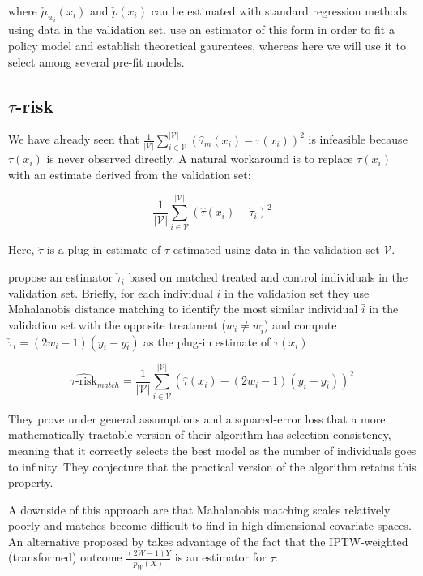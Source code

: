 where $\check\mu_{w_i}(x_i)$ and $\check p(x_i)$ can be estimated with standard regression methods using data in the validation set. \citet{Athey:wj} use an estimator of this form in order to fit a policy model and establish theoretical gaurentees, whereas here we will use it to select among several pre-fit models.

\subsection{$\tau$-risk}

We have already seen that $\frac{1}{|\mathcal{V}|}\sum_{i \in \mathcal{V}}^{|\mathcal{V}|}  (\hat \tau_m (x_i)- \tau(x_i))^2$ is infeasible because $\tau(x_i)$ is never observed directly. A natural workaround is to replace $\tau(x_i)$ with an estimate derived from the validation set:

\[
\frac{1}{|\mathcal{V}|}\sum_{i \in \mathcal{V}}^{|\mathcal{V}|}  (\hat \tau (x_i) -  \check \tau_i)^2
\]

Here, $\check \tau$ is a plug-in estimate of $\tau$ estimated using data in the validation set $\mathcal{V}$. 

\citet{Rolling:2013kz} propose an estimator $\check \tau_i$ based on matched treated and control individuals in the validation set. Briefly, for each individual $i$ in the validation set they use Mahalanobis distance matching to identify the most similar individual $\bar{i}$ in the validation set with the opposite treatment ($w_i \ne w_{\bar i}$) and compute $\check \tau_i = (2w_i -1)(y_i - y_{\bar i})$ as the plug-in estimate of $\tau(x_i)$. 

\begin{equation}
\widehat{\tau\text{-risk}}_{match} = \frac{1}{|\mathcal{V}|}\sum_{i \in \mathcal{V}}^{|\mathcal{V}|}  (\hat \tau (x_i) - (2w_i -1)(y_i - y_{\bar i}))^2
\label{trisk-match}
\end{equation}

They prove under general assumptions and a squared-error loss that a more mathematically tractable version of their algorithm has selection consistency, meaning that it correctly selects the best model as the number of individuals goes to infinity. They conjecture that the practical version of the algorithm retains this property.

A downside of this approach are that Mahalanobis matching scales relatively poorly and matches become difficult to find in high-dimensional covariate spaces. An alternative proposed by \citet{Gutierrez:2016tq} takes advantage of the fact that the IPTW-weighted (transformed) outcome $\frac{(2W-1)Y}{p_W(X)}$ is an estimator for $\tau$:

